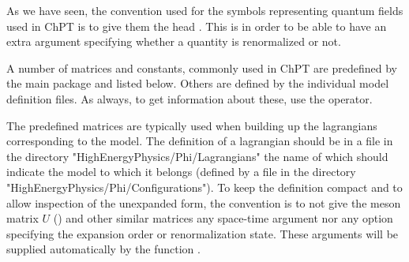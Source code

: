 As we have seen, the convention used for the symbols representing quantum fields used in ChPT
is to give them the head . This is in order to be able to have an extra argument
specifying whether a quantity is renormalized or not.



A number of matrices and constants, commonly used in ChPT are predefined by the main
package \fphi and listed below. Others are defined by the individual model definition files.
As always, to get information about these, use the  operator.


The predefined matrices are typically used when building up the lagrangians corresponding to
the model. The definition of a lagrangian should be in a file in the directory
"HighEnergyPhysics/Phi/Lagrangians" the name of which should indicate the model to which
it belongs (defined by a file in the directory "HighEnergyPhysics/Phi/Configurations").
To keep the definition compact and to allow inspection of the unexpanded form, the convention
is to not give the meson matrix $U$ (\mb[MM]) and other similar matrices any space-time argument
nor any option specifying the expansion order or renormalization state.
These arguments will be supplied automatically by the function .



